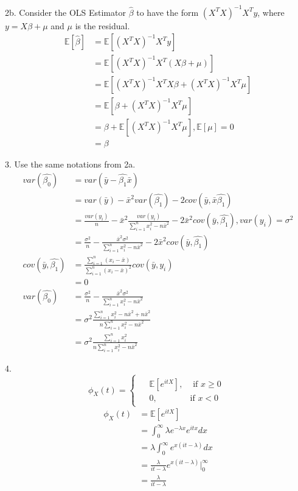 \documentclass[12pt]{article}
\begin{document}
2b. Consider the OLS Estimator $\hat{\beta}$ to have the form $(X^TX)^{-1}X^Ty$, where $y = X\beta + \mu$ and $\mu$ is the residual. 
\begin{align} \nonumber
\mathbb{E}[\hat{\beta}] &= \mathbb{E}[(X^TX)^{-1}X^Ty] \\ \nonumber
&= \mathbb{E}[(X^TX)^{-1}X^T(X\beta+\mu)] \\ \nonumber
&= \mathbb{E}[(X^TX)^{-1}X^TX\beta +(X^TX)^{-1}X^T\mu] \\ \nonumber
&= \mathbb{E}[\beta + (X^TX)^{-1}X^T\mu] \\ \nonumber
&= \beta + \mathbb{E}[(X^TX)^{-1}X^T\mu], \mathbb{E}[\mu] = 0\\ \nonumber
&= \beta 
\end{align}

3. Use the same notations from 2a. 
\begin{align} \nonumber
var(\hat{\beta_0}) &= var(\bar{y} - \hat{\beta_1}\bar{x}) \\ \nonumber
&= var(\bar{y}) - \bar{x}^2var(\hat{\beta_1}) - 2cov(\bar{y},\bar{x}\hat{\beta_1}) \\ \nonumber
&= \frac{var(y_i)}{n} -  \bar{x}^2\frac{var(y_i)}{\sum_{i = 1}^{n}x_i^2 - n\bar{x}^2} -2\bar{x}^2cov(\bar{y},\hat{\beta_1}), var(y_i) = \sigma^2 \\ \nonumber
&= \frac{\sigma^2}{n} -\frac{\bar{x}^2\sigma^2}{\sum_{i = 1}^{n}x_i^2 - n\bar{x}^2}-2\bar{x}^2cov(\bar{y},\hat{\beta_1}) \\ \nonumber
cov(\bar{y},\hat{\beta_1}) &= \frac{\sum_{i=1}^{n}(x_i - \bar{x})}{\sum_{i=1}^{n}(x_i - \bar{x})^2}cov(\bar{y},y_i) \\ \nonumber
&= 0 \\ \nonumber
var(\hat{\beta_0})&= \frac{\sigma^2}{n} -\frac{\bar{x}^2\sigma^2}{\sum_{i = 1}^{n}x_i^2 - n\bar{x}^2}\\ \nonumber
&= \sigma^2\frac{\sum_{i = 1}^{n}x_i^2 - n\bar{x}^2 + n\bar{x}^2}{n\sum_{i = 1}^{n}x_i^2 - n\bar{x}^2} \\ \nonumber
&= \sigma^2\frac{\sum_{i = 1}^{n}x_i^2}{n\sum_{i = 1}^{n}x_i^2 - n\bar{x}^2} 
\end{align}

4.
\[ \phi_X(t) = 
\begin{cases}
  \begin{aligned}
  &  \mathbb{E}[e^{itX}], &  \mbox{ if } x \geq 0 \\
  & 0, & \mbox{if } x < 0
  \end{aligned}
\end{cases}
\]
\begin{align} \nonumber
\phi_X(t) &= \mathbb{E}[e^{itX}] \\ \nonumber
&= \int_{0}^{\infty}\lambda e^{-\lambda x}e^{itx}dx \\ \nonumber
&= \lambda\int_{0}^{\infty}e^{x(it - \lambda)}dx \\ \nonumber
&= \frac{\lambda}{it - \lambda}e^{x(it-\lambda)}\big|_0^\infty \\ \nonumber
&= \frac{\lambda}{it - \lambda}
\end{align}
\end{document}
